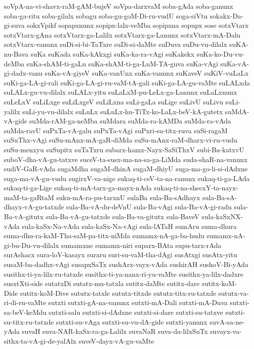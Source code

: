 {soVpA-na-vi-shavx-raM-gAM-bujeV
soVpa-darxvaM
soba-gAda
soba-ganunx
soba-ga-ritu
soba-gilalx
sobagu
soba-gu-goM-Di-ru-vudU
soga-siVtu
sokakx-Da-gi-suva
sokxVpikf
sopapxnunx
sopipx-lalx-veMba
sopipxna
sopupx
sose
sotxVtarx
sotxVtarx-gAna
sotxVtarx-ga-Lalilx
sotxVtarx-ga-Lanunx
sotxVtarx-mA-Dalu
sotxVtarx-vanunx
suDi-si-bi-TaTxre
suDi-si-daMte
suDuva
suDu-vu-dilalx
suKA-nu-Bava
suKa
suKada
suKa-kAkxgi
suKa-ka-ra-vAgi
suKakekx
suKa-ko-Du-vu-deMba
suKa-shAM-ti-gaLu
suKa-shAM-ti-ga-LuM-TA-guva
suKa-vAgi
suKa-vA-gi-dadx-vanu
suKa-vA-giyeV
suKa-vanUnx
suKa-vanunx
suKaveV
suKiV-vuLaLx
suKi-ga-LA-gi-rali
suKi-ga-LA-gi-ru-vaM-tA-gali
suKi-ga-LA-gu-vaMte
suLALxda
suLALx-gu-vu-dilalx
suLALx-yitu
suLaLxM-pu-LeLx-ga-Lanunx
suLaLxnunx
suLeLxV
suLiLxge
suLiLxgeV
suLiLxna
suLi-gaLa
suLige
suLivU
suLivu
suLi-yalilx
suLi-yu-vu-dilalx
suLuLx
suLuLx-hu-TiTx-ko-LaLx-beV-kA-gutetx
suMdA-vA-gide
suMda-rAM-ga-neMba
suMdara
suMda-ra-kAMDa
suMda-ra-vAda
suMda-ravU
suPxTa-vA-galu
suPxTa-vAgi
suPxri-su-titx-ruva
suSi-ragaM
suSuThx-vAgi
suSu-mAnx-mA-gaR-diMda
suSu-mAnx-raM-dharx-vi-ru-vudu
suSu-menxyu
suSupitx
suTaTxru
subarx-hamx-Nayx-SaSiThxV
subi-Ba-katxvU
suboV-dha-vA-gu-tatxve
suceV-ta-susx-ma-na-sa-ga-LiMda
suda-shaR-na-vanunx
sudiV-GaR-vAda
sugaMdha
sugaM-dhinA
sugaM-dhiyU
suga-ma-go-li-si-dAdxne
suga-ma-vA-gu-vudu
sugirxV-va-nige
sukaq-ti-ceV-ta-na-ranunx
sukaq-ti-ga-LAda
sukaq-ti-ga-Lige
sukaq-ti-mA-tarx-ga-mayx-nAda
sukaq-ti-na-shecxY-ta-nayx-maM-ta-gaRtaM
suku-mA-ra-pu-tarxnU
sulaBa
sula-Ba-sAdhayx
sula-Ba-sA-dhayx-vA-gu-tatxde
sula-Ba-vA-du-deVnU
sula-Ba-vAgi
sula-Ba-vA-gi-radu
sula-Ba-vA-gitutx
sula-Ba-vA-gu-tatxde
sula-Ba-va-gitutx
sula-BaveV
sula-kaSxNX-vAda
sula-kaSx-Na-vAda
sula-kaSx-Na-vAgi
sula-lATaH
sumAru
suma-dhura
suma-dhu-ra-kaM-Tha-saM-pa-titx-niMda
sumamx-nA-ga-ba-hudu
sumamx-nA-gi-bu-Du-vu-dilalx
sumamxne
sumamx-niri
suparx-BAta
supu-tarx-rAda
surAshacx
sura-loV-kasayx
suraru
suri-su-vaM-tha-dAgi
susAtxgi
susAtx-yitu
susaM-ba-dadhx-vAgi
susapxSaTx
sushArx-vayx-vAda
sushirAH
sushoV-Bi-yAda
susithx-ti-ya-lilx-ru-tatxde
susithx-ti-ya-nanx-ri-yu-vaMte
susithx-ya-lilx-dadxre
susxtXti-side
sutatxDi
sutatx-mu-tatxla
sutitx-daMte
sutitx-dare
sutitx-koM-Dide
sutitx-koM-Dive
sututx-tatxle
sututx-titxde
sututx-titx-ru-tatxde
sututx-va-ri-di-ru-vaMte
sutxti
sutxti-gA-na-vanunx
sutxti-mA-Dali
sutxti-mA-Duva
sutxti-sa-beV-keMdu
sutxti-salu
sutxti-si-dAdxne
sutxti-si-dare
sutxti-su-tatxve
sutxti-su-titx-ru-tatxde
sutxti-su-vAga
sutxti-su-vu-dA-gide
sutxti-yanunx
suvA-sa-ne-yAda
suvaH
suva-NAR-kaSx-ra-ga-Lalilx
suvaNaR
suva-da-lilxSuTx
suvayx-va-sithx-ta-vA-gi-de-yalAlx
suveV-dayx-vA-gu-vaMte
}
